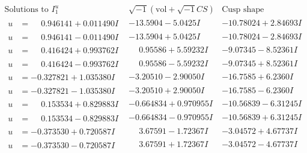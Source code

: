 \documentclass[1p]{elsarticle_modified}
\theoremstyle{definition}
\newcommand{\I}{\sqrt{-1}}
\begin{document}
$$\begin{array}{c|c|c}  
\text{Solutions to }I^u_{1}& \I (\text{vol} + \sqrt{-1}CS) & \text{Cusp shape}\\
 \hline 
\begin{aligned}
u &= \phantom{-}0.946141 + 0.011490 I\end{aligned}
 & -13.5904 - 5.0425 I & -10.78024 + 2.84693 I \\ \hline\begin{aligned}
u &= \phantom{-}0.946141 - 0.011490 I\end{aligned}
 & -13.5904 + 5.0425 I & -10.78024 - 2.84693 I \\ \hline\begin{aligned}
u &= \phantom{-}0.416424 + 0.993762 I\end{aligned}
 & \phantom{-}0.95586 + 5.59232 I & -9.07345 - 8.52361 I \\ \hline\begin{aligned}
u &= \phantom{-}0.416424 - 0.993762 I\end{aligned}
 & \phantom{-}0.95586 - 5.59232 I & -9.07345 + 8.52361 I \\ \hline\begin{aligned}
u &= -0.327821 + 1.035380 I\end{aligned}
 & -3.20510 - 2.90050 I & -16.7585 + 6.2360 I \\ \hline\begin{aligned}
u &= -0.327821 - 1.035380 I\end{aligned}
 & -3.20510 + 2.90050 I & -16.7585 - 6.2360 I \\ \hline\begin{aligned}
u &= \phantom{-}0.153534 + 0.829883 I\end{aligned}
 & -0.664834 + 0.970955 I & -10.56839 - 6.31245 I \\ \hline\begin{aligned}
u &= \phantom{-}0.153534 - 0.829883 I\end{aligned}
 & -0.664834 - 0.970955 I & -10.56839 + 6.31245 I \\ \hline\begin{aligned}
u &= -0.373530 + 0.720587 I\end{aligned}
 & \phantom{-}3.67591 - 1.72367 I & -3.04572 + 4.67737 I \\ \hline\begin{aligned}
u &= -0.373530 - 0.720587 I\end{aligned}
 & \phantom{-}3.67591 + 1.72367 I & -3.04572 - 4.67737 I \\ \hline\begin{aligned}

\end{aligned}
\end{array}$$
\end{document}

